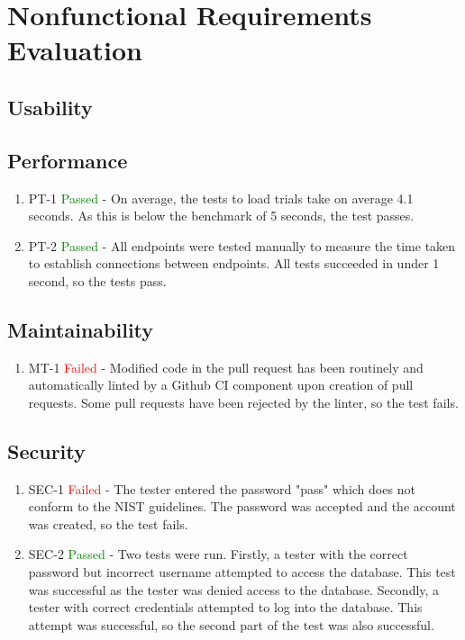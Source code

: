 \documentclass[12pt, titlepage]{article}
\begin{document}
\section{Nonfunctional Requirements Evaluation}

\subsection{Usability}
		
\subsection{Performance}
\begin{enumerate}
  \item PT-1 \textcolor{green}{Passed} - On average, the tests to load trials take on average 4.1 seconds. As this is below the benchmark of 5 seconds, the test passes.
\item PT-2 \textcolor{green}{Passed} - All endpoints were tested manually to measure the time taken to establish connections between endpoints. All tests succeeded in under 1 second, so the tests pass.
\end{enumerate}

\subsection{Maintainability}
\begin{enumerate}
  \item MT-1 \textcolor{red}{Failed} - Modified code in the pull request has been routinely and automatically linted by a Github CI component upon creation of pull requests. Some pull requests have been rejected by the linter, so the test fails.
\end{enumerate}

\subsection{Security}
\begin{enumerate}
  \item SEC-1 \textcolor{red}{Failed} - The tester entered the password "pass" which does not conform to the NIST guidelines. The password was accepted and the account was created, so the test fails.
\item SEC-2 \textcolor{green}{Passed} - Two tests were run. Firstly, a tester with the correct password but incorrect username attempted to access the database. This test was successful as the tester was denied access to the database. Secondly, a tester with correct credentials attempted to log into the database. This attempt was successful, so the second part of the test was also successful.
\end{enumerate}
\end{document}
